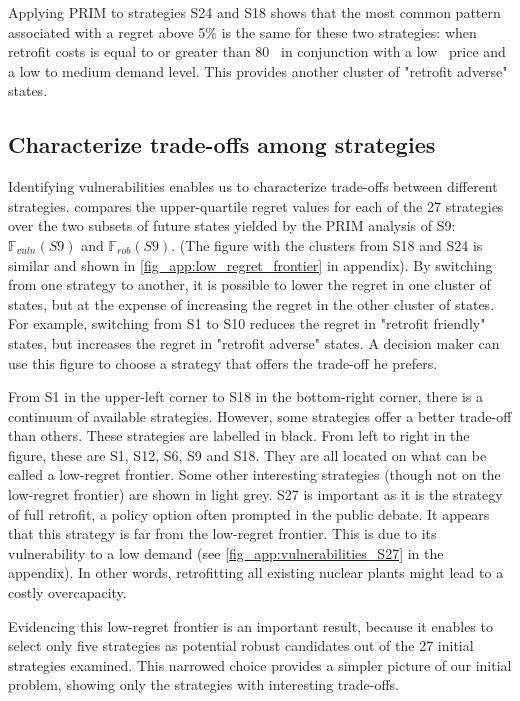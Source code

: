 Applying PRIM to strategies S24 and S18 shows that the most common pattern associated with a regret above 5\% is the same for these two strategies: when retrofit costs is equal to or greater than 80 \emwh\ in conjunction with a low \coo\ price and a low to medium demand level. This provides another cluster of "retrofit adverse" states.


\subsection{Characterize trade-offs among strategies}

Identifying vulnerabilities enables us to characterize trade-offs between different strategies.  compares the upper-quartile regret values for each of the 27 strategies over the two subsets of future states yielded by the PRIM analysis of S9: $\mathbb{F}_{vuln}(S9)$ and $\mathbb{F}_{rob}(S9)$. (The figure with the clusters from S18 and S24 is similar and shown in \cref{fig_app:low_regret_frontier} in appendix).
By switching from one strategy to another, it is possible to lower the regret in one cluster of states, but at the expense of increasing the regret in the other cluster of states. For example, switching from S1 to S10 reduces the regret in "retrofit friendly" states, but increases the regret in "retrofit adverse" states. 
A decision maker can use this figure to choose a strategy that offers the trade-off he prefers. 

From S1 in the upper-left corner to S18 in the bottom-right corner, there is a continuum of available strategies. 
However, some strategies offer a better trade-off than others. 
These strategies are labelled in black. From left to right in the figure, these are S1, S12, S6, S9 and S18. 
They are all located on what can be called a low-regret frontier. 
Some other interesting strategies (though not on the low-regret frontier) are shown in light grey. 
S27 is important as it is the strategy of full retrofit, a policy option often prompted in the public debate. 
It appears that this strategy is far from the low-regret frontier. 
This is due to its vulnerability to a low demand (see \cref{fig_app:vulnerabilities_S27} in the appendix). In other words, retrofitting all existing nuclear plants might lead to a costly overcapacity.

Evidencing this low-regret frontier is an important result, because it enables to select only five strategies as potential robust candidates out of the 27 initial strategies examined. This narrowed choice provides a simpler picture of our initial problem, showing only the strategies with interesting trade-offs.

